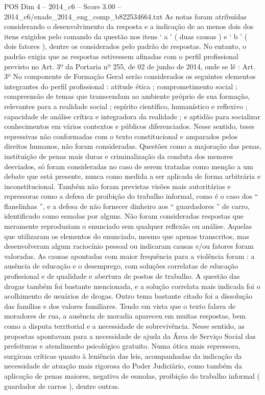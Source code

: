 \begin{textsample}{POS Dim 4 – 2014\_c6 – Score 3.00 – 2014\_c6/enade\_2014\_eng\_comp\_b822534664.txt}
As notas foram atribuídas considerando o desenvolvimento da resposta e a indicação de ao menos dois dos itens exigidos pelo comando da questão nos itens ‘ a ’ ( duas causas ) e ‘ b ’ ( dois fatores ), dentre os considerados pelo padrão de respostas.
No entanto, o padrão exigia que as respostas estivessem afinadas com o perfil profissional previsto no Art. 3º da Portaria nº 255, de 02 de junho de 2014, onde se lê : Art. 3º No componente de Formação Geral serão considerados os seguintes elementos integrantes do perfil profissional : atitude ética ; comprometimento social ; compreensão de temas que transcendam ao ambiente próprio de sua formação, relevantes para a realidade social ; espírito científico, humanístico e reflexivo ; capacidade de análise crítica e integradora da realidade ; e aptidão para socializar conhecimentos em vários contextos e públicos diferenciados.
Nesse sentido, teses repressivas não conformadas com o texto constitucional e amparados pelos direitos humanos, não foram consideradas.
Questões como a majoração das penas, instituição de penas mais duras e criminalização da conduta dos menores desviados, só foram consideradas no caso de serem tratadas como menção a um debate que está presente, nunca como medida a ser aplicada de forma arbitrária e inconstitucional.
Também não foram previstas visões mais autoritárias e repressoras como a defesa de proibição do trabalho informal, como é o caso dos “ flanelinhas ”, e a defesa de não fornecer dinheiro aos “ guardadores ” de carro, identificado como esmolas por alguns.
Não foram consideradas respostas que meramente reproduziam o enunciado sem qualquer reflexão ou análise.
Aquelas que utilizaram os elementos do enunciado, mesmo que apenas transcritos, mas desenvolveram algum raciocínio pessoal ou indicaram causas e/ou fatores foram valoradas.
As causas apontadas com maior frequência para a violência foram : a ausência de educação e o desemprego, com soluções correlatas de educação profissional e de qualidade e abertura de postos de trabalho.
A questão das drogas também foi bastante mencionada, e a solução correlata mais indicada foi o acolhimento de usuários de drogas.
Outro tema bastante citado foi a dissolução das famílias e dos valores familiares.
Tendo em vista que o texto falava de moradores de rua, a ausência de moradia apareceu em muitas respostas, bem como a disputa territorial e a necessidade de sobrevivência.
Nesse sentido, as propostas apontavam para a necessidade de ajuda da Área de Serviço Social das prefeituras e atendimento psicológico gratuito.
Numa ótica mais repressora, surgiram críticas quanto à leniência das leis, acompanhadas da indicação da necessidade de atuação mais rigorosa do Poder Judiciário, como também da aplicação de penas maiores, negativa de esmolas, proibição do trabalho informal ( guardador de carros ), dentre outras.

\end{textsample}
